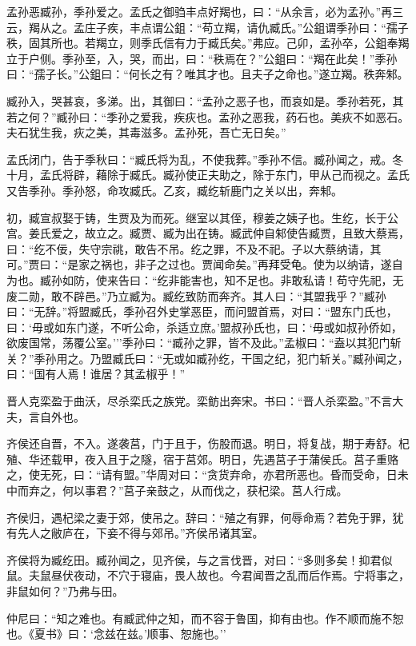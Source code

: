 \documentclass[]{article}
\begin{document}
孟孙恶臧孙，季孙爱之。孟氏之御驺丰点好羯也，曰：``从余言，必为孟孙。''再三云，羯从之。孟庄子疾，丰点谓公鉏：``苟立羯，请仇臧氏。''公鉏谓季孙曰：``孺子秩，固其所也。若羯立，则季氏信有力于臧氏矣。''弗应。己卯，孟孙卒，公鉏奉羯立于户侧。季孙至，入，哭，而出，曰：``秩焉在？''公鉏曰：``羯在此矣！''季孙曰：``孺子长。''公鉏曰：``何长之有？唯其才也。且夫子之命也。''遂立羯。秩奔邾。

臧孙入，哭甚哀，多涕。出，其御曰：``孟孙之恶子也，而哀如是。季孙若死，其若之何？''臧孙曰：``季孙之爱我，疾疢也。孟孙之恶我，药石也。美疢不如恶石。夫石犹生我，疢之美，其毒滋多。孟孙死，吾亡无日矣。''

孟氏闭门，告于季秋曰：``臧氏将为乱，不使我葬。''季孙不信。臧孙闻之，戒。冬十月，孟氏将辟，藉除于臧氏。臧孙使正夫助之，除于东门，甲从己而视之。孟氏又告季孙。季孙怒，命攻臧氏。乙亥，臧纥斩鹿门之关以出，奔邾。

初，臧宣叔娶于铸，生贾及为而死。继室以其侄，穆姜之姨子也。生纥，长于公宫。姜氏爱之，故立之。臧贾、臧为出在铸。臧武仲自邾使告臧贾，且致大蔡焉，曰：``纥不佞，失守宗祧，敢告不吊。纥之罪，不及不祀。子以大蔡纳请，其可。''贾曰：``是家之祸也，非子之过也。贾闻命矣。''再拜受龟。使为以纳请，遂自为也。臧孙如防，使来告曰：``纥非能害也，知不足也。非敢私请！苟守先祀，无废二勋，敢不辟邑。''乃立臧为。臧纥致防而奔齐。其人曰：``其盟我乎？''臧孙曰：``无辞。''将盟臧氏，季孙召外史掌恶臣，而问盟首焉，对曰：``盟东门氏也，曰：`毋或如东门遂，不听公命，杀适立庶。'盟叔孙氏也，曰：`毋或如叔孙侨如，欲废国常，荡覆公室。'''季孙曰：``臧孙之罪，皆不及此。''孟椒曰：``盍以其犯门斩关？''季孙用之。乃盟臧氏曰：``无或如臧孙纥，干国之纪，犯门斩关。''臧孙闻之，曰：``国有人焉！谁居？其孟椒乎！''

晋人克栾盈于曲沃，尽杀栾氏之族党。栾鲂出奔宋。书曰：``晋人杀栾盈。''不言大夫，言自外也。

齐侯还自晋，不入。遂袭莒，门于且于，伤股而退。明日，将复战，期于寿舒。杞殖、华还载甲，夜入且于之隧，宿于莒郊。明日，先遇莒子于蒲侯氏。莒子重赂之，使无死，曰：``请有盟。''华周对曰：``贪货弃命，亦君所恶也。昏而受命，日未中而弃之，何以事君？''莒子亲鼓之，从而伐之，获杞梁。莒人行成。

齐侯归，遇杞梁之妻于郊，使吊之。辞曰：``殖之有罪，何辱命焉？若免于罪，犹有先人之敝庐在，下妾不得与郊吊。''齐侯吊诸其室。

齐侯将为臧纥田。臧孙闻之，见齐侯，与之言伐晋，对曰：``多则多矣！抑君似鼠。夫鼠昼伏夜动，不穴于寝庙，畏人故也。今君闻晋之乱而后作焉。宁将事之，非鼠如何？''乃弗与田。

仲尼曰：``知之难也。有臧武仲之知，而不容于鲁国，抑有由也。作不顺而施不恕也。《夏书》曰：`念兹在兹。'顺事、恕施也。''
\end{document}
